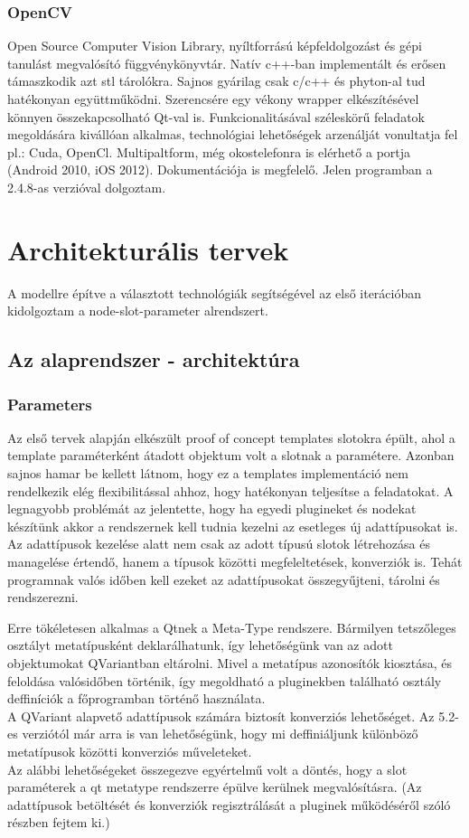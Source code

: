 \documentclass[a4paper,12pt,oneside]{report}
\begin{document}
\subsubsection{OpenCV}	
Open Source Computer Vision Library, nyíltforrású képfeldolgozást és gépi tanulást megvalósító függvénykönyvtár.\cite{website:opencv_about} Natív c++-ban implementált és erősen támaszkodik azt stl tárolókra. Sajnos gyárilag csak c/c++ és phyton-al tud hatékonyan együttműködni. Szerencsére egy vékony wrapper elkészítésével könnyen összekapcsolható Qt-val is. Funkcionalitásával széleskörű feladatok megoldására kivállóan alkalmas, technológiai lehetőségek arzenálját vonultatja fel pl.: Cuda, OpenCl. Multipaltform, még okostelefonra is elérhető a portja (Android 2010, iOS 2012). Dokumentációja is megfelelő. Jelen programban a 2.4.8-as verzióval dolgoztam.


\section{Architekturális tervek}
A modellre építve a választott technológiák segítségével az első iterációban kidolgoztam a node-slot-parameter alrendszert.
\subsection{Az alaprendszer - architektúra}
\subsubsection{Parameters}
Az első tervek alapján elkészült proof of concept templates slotokra épült, ahol a template paraméterként átadott objektum volt a slotnak a paramétere. Azonban sajnos hamar be kellett látnom, hogy ez a templates implementáció nem rendelkezik elég flexibilitással ahhoz, hogy hatékonyan teljesítse a feladatokat. A legnagyobb problémát az jelentette, hogy ha egyedi plugineket és nodekat készítünk akkor a rendszernek kell tudnia kezelni az esetleges új adattípusokat is. Az adattípusok kezelése alatt nem csak az adott típusú slotok létrehozása és managelése értendő, hanem a típusok közötti megfeleltetések, konverziók is. Tehát programnak valós időben kell ezeket az adattípusokat összegyűjteni, tárolni és rendszerezni.

Erre tökéletesen alkalmas a Qtnek a Meta-Type rendszere. Bármilyen tetszőleges osztályt metatípusként deklarálhatunk, így lehetőségünk van az adott objektumokat QVariantban eltárolni. \cite{website:qt_metatype_1} Mivel a metatípus azonosítók kiosztása, és feloldása valósidőben történik, így megoldható a pluginekben található osztály deffiníciók a főprogramban történő használata.\\
A QVariant alapvető adattípusok számára biztosít konverziós lehetőséget. Az 5.2-es verziótól már arra is van lehetőségünk, hogy mi deffiniáljunk különböző metatípusok közötti konverziós műveleteket. \\ Az alábbi lehetőségeket összegezve egyértelmű volt a döntés, hogy a slot paraméterek a qt metatype rendszerre épülve kerülnek megvalósításra. (Az adattípusok betöltését és konverziók regisztrálását a pluginek működéséről szóló részben fejtem ki.)
\end{document}
